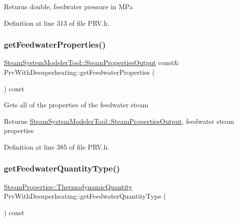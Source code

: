\begin{DoxyReturn}{Returns}
double, feedwater pressure in M\+Pa 
\end{DoxyReturn}


Definition at line 313 of file P\+R\+V.\+h.

\mbox{\label{class_prv_with_desuperheating_a8f4594109bda9bc4030c23cee9841fa8}} 
\subsubsection{\texorpdfstring{get\+Feedwater\+Properties()}{getFeedwaterProperties()}}
{\footnotesize\ttfamily \hyperlink{struct_steam_system_modeler_tool_1_1_steam_properties_output}{Steam\+System\+Modeler\+Tool\+::\+Steam\+Properties\+Output} const\& Prv\+With\+Desuperheating\+::get\+Feedwater\+Properties (\begin{DoxyParamCaption}{ }\end{DoxyParamCaption}) const\hspace{0.3cm}{\ttfamily [inline]}}

Gets all of the properties of the feedwater steam \begin{DoxyReturn}{Returns}
\hyperlink{struct_steam_system_modeler_tool_1_1_steam_properties_output}{Steam\+System\+Modeler\+Tool\+::\+Steam\+Properties\+Output}, feedwater steam properties 
\end{DoxyReturn}


Definition at line 385 of file P\+R\+V.\+h.

\mbox{\label{class_prv_with_desuperheating_aa6901e00ecf819d95f79c20ef1775876}} 
\subsubsection{\texorpdfstring{get\+Feedwater\+Quantity\+Type()}{getFeedwaterQuantityType()}}
{\footnotesize\ttfamily \hyperlink{class_steam_properties_ae0294bedf7d178c2d8fb6aed0f62fbff}{Steam\+Properties\+::\+Thermodynamic\+Quantity} Prv\+With\+Desuperheating\+::get\+Feedwater\+Quantity\+Type (\begin{DoxyParamCaption}{ }\end{DoxyParamCaption}) const\hspace{0.3cm}{\ttfamily [inline]}}

